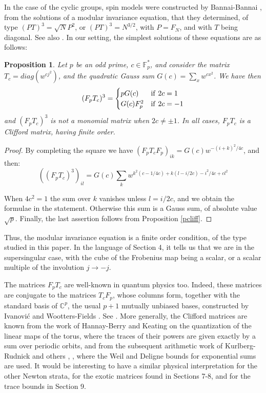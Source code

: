\documentclass[11pt]{amsart}
\newtheorem{proposition}[theorem]{Proposition}
\theoremstyle{definition}
\begin{document}
\medskip

In the case of the cyclic groups, spin models were constructed by Bannai-Bannai \cite{bb1}, from the solutions of a modular invariance equation, that they determined, of type $(PT)^3=\sqrt{N}P^2$, or $(PT)^3=N^{3/2}$, with $P=F_N$, and with $T$ being diagonal. See also \cite{bbj}. In our setting, the simplest solutions of these equations are as follows:

\begin{proposition}\label{pmod}
Let $p$ be an odd prime, $c\in\mathbb F_p^*$, and consider the matrix $T_c=diag(w^{cj^2})$, and the quadratic Gauss sum $G(c)=\sum_xw^{cx^2}$. We have then
$$(F_pT_c)^3=\begin{cases}
pG(c)&{\rm if}\ 2c=1\\
G(c)F_p^2&{\rm if}\ 2c=-1
\end{cases}$$
and $(F_pT_c)^3$ is not a monomial matrix when $2c\neq\pm1$. In all cases, $F_pT_c$ is a Clifford matrix, having finite order.
\end{proposition}

\begin{proof}
By completing the square we have $(F_pT_cF_p)_{ik}=G(c)w^{-(i+k)^2/4c}$, and then:
$$((F_pT_c)^3)_{il}=G(c)\sum_kw^{k^2(c-1/4c)+k(l-i/2c)-i^2/4c+cl^2}$$

When $4c^2=1$ the sum over $k$ vanishes unless $l=i/2c$, and we obtain the formulae in the statement. Otherwise this sum is a Gauss sum, of absolute value $\sqrt{p}$. Finally, the last assertion follows from Proposition \ref{pcliff}.
\end{proof}

Thus, the modular invariance equation is a finite order condition, of the type studied in this paper. In the language of Section 4, it tells us that we are in the supersingular case, with the cube of the Frobenius map being a scalar, or a scalar multiple of the involution $j\to-j$. 

\medskip

The matrices $F_pT_c$ are well-known in quantum physics too. Indeed, these matrices are conjugate to the matrices $T_cF_p$, whose columns form, together with the standard basis of $\mathbb C^p$, the usual $p+1$ mutually unbiased bases, constructed by Ivanovi\'c \cite{iva} and Wootters-Fields \cite{wfi}. See \cite{mwe}. More generally, the Clifford matrices are known from the work of Hannay-Berry \cite{hbe} and Keating \cite{kea} on the quantization of the linear maps of the torus, where the traces of their powers are given exactly by a sum over periodic orbits, and from the subsequent arithmetic work of Kurlberg-Rudnick and others \cite{krr}, \cite{kru}, where the Weil and Deligne bounds for exponential sums are used. It would be interesting to have a similar physical interpretation for the other Newton strata, for the exotic matrices found in Sections 7-8, and for the trace bounds in Section 9.
\end{document}
